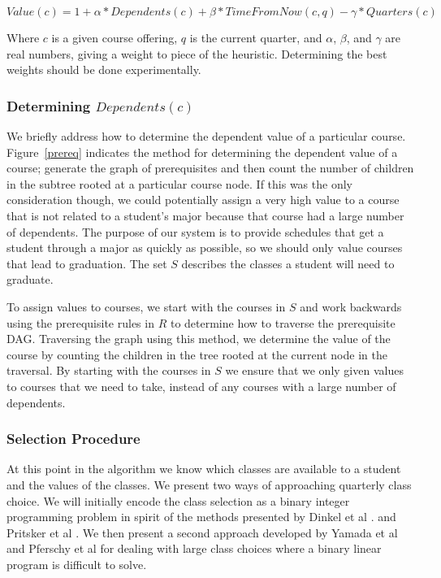 \documentclass[11pt]{article} %
\begin{document}
\begin{equation} 
    Value(c) = 1 + \alpha * Dependents(c) + \beta * TimeFromNow(c,q) 
    - \gamma * Quarters(c)
    \label{value_func}
\end{equation} 

Where $c$ is a given course offering, $q$ is the current quarter, and $\alpha$,
$\beta$, and $\gamma$ are real numbers, giving a weight to piece of the
heuristic. Determining the best weights should be done experimentally.

\subsubsection{Determining $Dependents(c)$} We briefly address how to determine
the dependent value of a particular course. Figure~\ref{prereq} indicates the
method for determining the dependent value of a course; generate the graph of
prerequisites and then count the number of children in the subtree rooted at
a particular course node. If this was the only consideration though, we could
potentially assign a very high value to a course that is not related to
a student's major because that course had a large number of dependents. The
purpose of our system is to provide schedules that get a student through a major
as quickly as possible, so we should only value courses that lead to graduation.
The set $S$ describes the classes a student will need to graduate.

To assign values to courses, we start with the courses in $S$ and work backwards
using the prerequisite rules in $R$ to determine how to traverse the
prerequisite DAG. Traversing the graph using this method, we determine the value
of the course by counting the children in the tree rooted at the current node in
the traversal. By starting with the courses in $S$ we ensure that we only given
values to courses that we need to take, instead of any courses with a large
number of dependents.

\subsubsection{Selection Procedure} At this point in the algorithm we know which
classes are available to a student and the values of the classes.  We present two
ways of approaching quarterly class choice.  We will initially encode the class
selection as a binary integer programming problem in spirit of the methods
presented by Dinkel et al \cite{dinkel:scheduling}. and Pritsker et al
\cite{prisker:informs}.  We then present a second approach developed by Yamada et al
\cite{yamada:heuristic} and Pferschy et al \cite{pferschy:kcg} for
dealing with large class choices where a binary linear program is difficult to solve.
\end{document}

